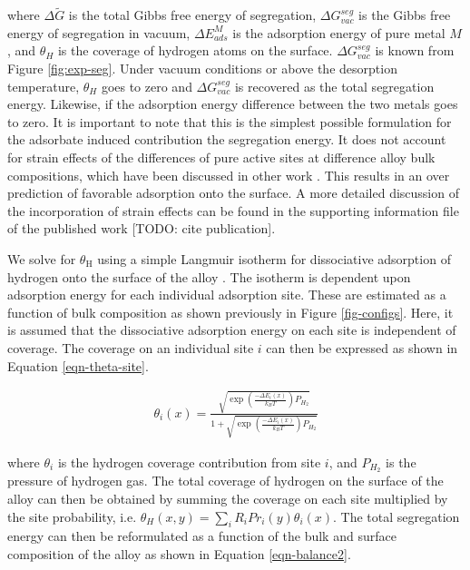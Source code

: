 \documentclass[12pt]{cmuthesis}
\begin{document}
\noindent
where \(\Delta \widetilde{G}\) is the total Gibbs free energy of segregation, \(\Delta G^{seg}_{vac}\) is the Gibbs free energy of segregation in vacuum, \(\Delta E^{M}_{ads}\) is the adsorption energy of pure metal \(M\), and \(\theta_{H}\) is the coverage of hydrogen atoms on the surface. \(\Delta G^{seg}_{vac}\) is known from Figure \ref{fig:exp-seg}.  Under vacuum conditions or above the desorption temperature, \(\theta_{H}\) goes to zero and \(\Delta G^{seg}_{vac}\) is recovered as the total segregation energy. Likewise, if the adsorption energy difference between the two metals goes to zero. It is important to note that this is the simplest possible formulation for the adsorbate induced contribution the segregation energy. It does not account for strain effects of the differences of pure active sites at difference alloy bulk compositions, which have been discussed in other work \cite{roudgar-2005-hydrog}. This results in an over prediction of favorable adsorption onto the surface. A more detailed discussion of the incorporation of strain effects can be found in the supporting information file of the published work [TODO: cite publication].

We solve for \(\theta_{\text{H}}\) using a simple Langmuir isotherm for dissociative adsorption of hydrogen onto the surface of the alloy \cite{miller-2012-segreg-at}. The isotherm is dependent upon adsorption energy for each individual adsorption site. These are estimated as a function of bulk composition as shown previously in Figure \ref{fig-configs}. Here, it is assumed that the dissociative adsorption energy on each site is independent of coverage. The coverage on an individual site \(i\) can then be expressed as shown in Equation \eqref{eqn-theta-site}.

\begin{eqnarray}
\theta_{i} (x) = \frac{\sqrt{\exp\left(\frac{-\Delta E_{i}(x)}{k_{B} T}\right) P_{H_2}}}{1 + \sqrt{\exp\left(\frac{-\Delta E_{i}(x)}{k_{B} T}\right) P_{H_2}}}
\label{eqn-theta-site}
\end{eqnarray}

\noindent
where \(\theta_{i}\) is the hydrogen coverage contribution from site \(i\), and \(P_{H_2}\) is the pressure of hydrogen gas. The total coverage of hydrogen on the surface of the alloy can then be obtained by summing the coverage on each site multiplied by the site probability, i.e. \(\theta_{H} (x,y) = \sum\limits_i R_{i} Pr_{i}(y) \theta_{i} (x)\). The total segregation energy can then be reformulated as a function of the bulk and surface composition of the alloy as shown in Equation \eqref{eqn-balance2}.
\end{document}
